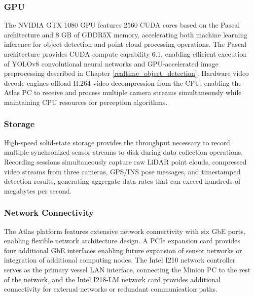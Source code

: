 \subsubsection{GPU}
The NVIDIA GTX 1080 GPU features 2560 CUDA cores based on the Pascal architecture and 8 GB of GDDR5X memory, accelerating both machine learning inference for object detection and point cloud processing operations.
The Pascal architecture provides CUDA compute capability 6.1, enabling efficient execution of YOLOv8 convolutional neural networks and GPU-accelerated image preprocessing described in Chapter \ref{realtime_object_detection}.
Hardware video decode engines offload H.264 video decompression from the CPU, enabling the Atlas PC to receive and process multiple camera streams simultaneously while maintaining CPU resources for perception algorithms.

\subsubsection{Storage}
High-speed solid-state storage provides the throughput necessary to record multiple synchronized sensor streams to disk during data collection operations.
Recording sessions simultaneously capture raw LiDAR point clouds, compressed video streams from three cameras, GPS/INS pose messages, and timestamped detection results, generating aggregate data rates that can exceed hundreds of megabytes per second.

\subsubsection{Network Connectivity}
The Atlas platform features extensive network connectivity with six \ac{GbE} ports, enabling flexible network architecture design. %
A PCIe expansion card provides four additional \ac{GbE} interfaces %
enabling future expansion of sensor networks or integration of additional computing nodes.
The Intel I210 network controller serves as the primary vessel LAN interface, connecting the Minion PC to the rest of the network, and the Intel I218-LM network card provides additional connectivity for external networks or redundant communication paths.


